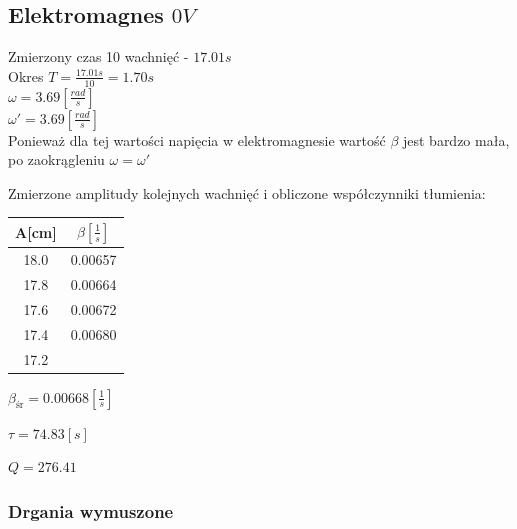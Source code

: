 \documentclass[]{article}
\begin{document}
	\subsection{Elektromagnes $0V$}
	Zmierzony czas 10 wachnięć - $17.01s$\\
	Okres $T = \frac{17.01s}{10}=1.70s$\\
	$\omega = 3.69 \left[ \frac{rad}{s}\right]$\\
	$\omega' = 3.69 \left[ \frac{rad}{s}\right]$\\
	Ponieważ dla tej wartości napięcia w elektromagnesie wartość $\beta$ jest bardzo mała, po zaokrągleniu $\omega=\omega'$\\
	\pagebreak
	
	Zmierzone amplitudy kolejnych wachnięć i obliczone współczynniki tłumienia:
	\begin{table}[h]
		\begin{tabular}{|c|c|}
			\hline 
			A[cm] & $\beta\left[ \frac{1}{s}\right] $ \\ 
			\hline 
			18.0 & 0.00657 \\ 
			\hline 
			17.8 & 0.00664 \\ 
			\hline 
			17.6 & 0.00672 \\ 
			\hline 
			17.4 & 0.00680 \\ 
			\hline 
			17.2 &  \\ 
			\hline 
		\end{tabular} 
	\end{table}
	
	
	$\beta_{\text{śr}} = 0.00668 \left[ \frac{1}{s}\right] $
	
	$\tau=74.83[s]$
	
	$Q = 276.41$
	
	
	\subsubsection{Drgania wymuszone}
	
\end{document}

